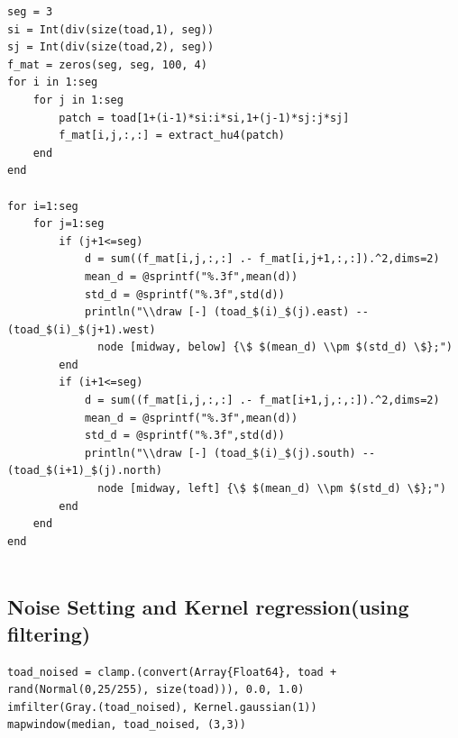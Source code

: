 \documentclass{article}
\begin{document}
\begin{lstlisting}
seg = 3
si = Int(div(size(toad,1), seg))
sj = Int(div(size(toad,2), seg))
f_mat = zeros(seg, seg, 100, 4)
for i in 1:seg
    for j in 1:seg
        patch = toad[1+(i-1)*si:i*si,1+(j-1)*sj:j*sj]
        f_mat[i,j,:,:] = extract_hu4(patch)
    end
end

for i=1:seg
    for j=1:seg
        if (j+1<=seg)
            d = sum((f_mat[i,j,:,:] .- f_mat[i,j+1,:,:]).^2,dims=2)
            mean_d = @sprintf("%.3f",mean(d))
            std_d = @sprintf("%.3f",std(d))
            println("\\draw [-] (toad_$(i)_$(j).east) -- (toad_$(i)_$(j+1).west) 
              node [midway, below] {\$ $(mean_d) \\pm $(std_d) \$};")
        end
        if (i+1<=seg)
            d = sum((f_mat[i,j,:,:] .- f_mat[i+1,j,:,:]).^2,dims=2)
            mean_d = @sprintf("%.3f",mean(d))
            std_d = @sprintf("%.3f",std(d))
            println("\\draw [-] (toad_$(i)_$(j).south) -- (toad_$(i+1)_$(j).north) 
              node [midway, left] {\$ $(mean_d) \\pm $(std_d) \$};")
        end
    end
end


\end{lstlisting}

\subsection{Noise Setting and Kernel regression(using filtering)}

\begin{lstlisting}
toad_noised = clamp.(convert(Array{Float64}, toad + rand(Normal(0,25/255), size(toad))), 0.0, 1.0)
imfilter(Gray.(toad_noised), Kernel.gaussian(1))
mapwindow(median, toad_noised, (3,3))
\end{lstlisting}
\end{document}
